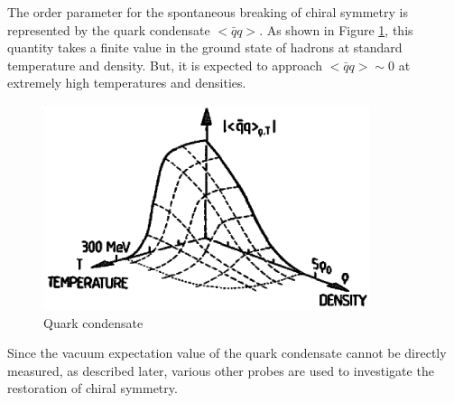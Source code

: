         The order parameter for the spontaneous breaking of chiral symmetry is represented by the quark condensate $< \bar{q}q >$. As shown in Figure \ref{quark_condensate}, this quantity takes a finite value in the ground state of hadrons at standard temperature and density. But, it is expected to approach $< \bar{q}q > \sim 0$ at extremely high temperatures and densities.  
        \begin{figure}[htbp]  
            \centering  
            \includegraphics[keepaspectratio, scale=0.6]{fig/1_1_quark_condensate.png}  
            \caption{Quark condensate\cite{Weise:1993ax}}  
            \label{quark_condensate}  
        \end{figure}  
        
        Since the vacuum expectation value of the quark condensate cannot be directly measured, as described later, various other probes are used to investigate the restoration of chiral symmetry.

